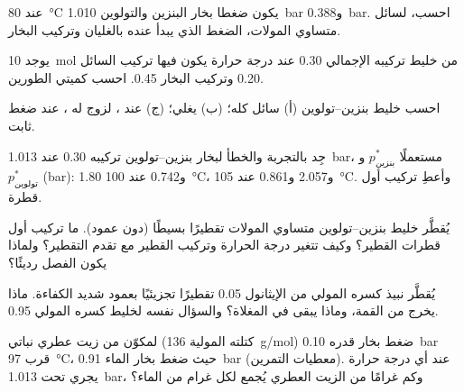 \begin{exercise}[$\star$]\label{exo:b2:liquid-vapour-diagrams:2}
عند \qty{80}{\degreeCelsius} يكون ضغطا بخار البنزين والتولوين
\qty{1.010}{bar} و\qty{0.388}{bar}. احسب، لسائل متساوي المولات،
الضغط الذي يبدأ عنده بالغليان وتركيب البخار.
\end{exercise}

\begin{exercise}[$\star$]\label{exo:b2:liquid-vapour-diagrams:3}
يوجد \qty{10}{mol} من خليط تركيبه الإجمالي 0.30 عند درجة حرارة
يكون فيها تركيب السائل 0.20 وتركيب البخار 0.45. احسب كميتي
الطورين.
\end{exercise}

\begin{exercise}[$\star$]\label{exo:b2:liquid-vapour-diagrams:4}
احسب  خليط بنزين--تولوين (أ) سائل كله؛ (ب)
يغلي؛ (ج) عند ، لزوج له ، عند ضغط ثابت.
\end{exercise}

\begin{exercise}[$\star\star$]\label{exo:b2:liquid-vapour-diagrams:5}
جِد بالتجربة والخطأ  لبخار بنزين--تولوين تركيبه 0.30 عند
\qty{1.013}{bar}، مستعملًا $p^*_{\text{بنزين}}$ و$p^*_{\text{تولوين}}$
(\unit{bar}): 1.80 و0.742 عند \qty{100}{\degreeCelsius}، و2.057 و0.861 عند
\qty{105}{\degreeCelsius}. وأعطِ تركيب أول قطرة.
\end{exercise}

\begin{exercise}[$\star\star$]\label{exo:b2:liquid-vapour-diagrams:6}
يُقطَّر خليط بنزين--تولوين متساوي المولات تقطيرًا بسيطًا (دون عمود). ما
تركيب أول قطرات القطير؟ وكيف تتغير درجة الحرارة وتركيب
القطير مع تقدم التقطير؟ ولماذا يكون
الفصل رديئًا؟
\end{exercise}

\begin{exercise}[$\star\star$]\label{exo:b2:liquid-vapour-diagrams:7}
يُقطَّر نبيذ كسره المولي من الإيثانول 0.05 تقطيرًا تجزيئيًا بعمود شديد
الكفاءة. ماذا يخرج من القمة، وماذا يبقى في المغلاة؟
والسؤال نفسه لخليط كسره المولي 0.95.
\end{exercise}

\begin{exercise}[$\star\star$]\label{exo:b2:liquid-vapour-diagrams:8}
لمكوّن من زيت عطري نباتي (كتلته المولية \qty{136}{g/mol}) ضغط بخار
قدره \qty{0.10}{bar} قرب \qty{97}{\degreeCelsius}، حيث ضغط بخار الماء
\qty{0.91}{bar} (معطيات التمرين). عند أي درجة حرارة يجري 
تحت \qty{1.013}{bar}، وكم غرامًا من الزيت العطري
يُجمع لكل غرام من الماء؟
\end{exercise}

